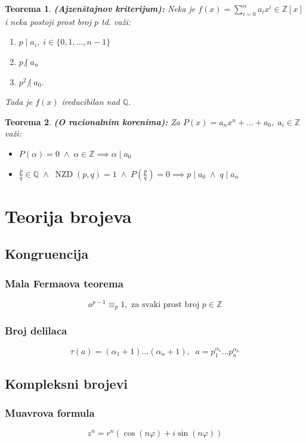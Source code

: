 \documentclass[a4paper,12pt,twoside]{report}
\newtheorem{theorem}{Teorema}[section]
\numberwithin{algorithm}{section}
\begin{document}
\begin{theorem}
    \textbf{(Ajzenštajnov kriterijum):} Neka je $f(x) = \sum_{i=0}^{n}a_ix^i \in \mathbb{Z}[x]$ i neka postoji prost broj $p$ td. važi:
    \begin{enumerate}
        \item $p\;|\; a_i, \; i \in \{0, 1, \dots, n-1\}$
        \item $p \;\not | \; a_n$
        \item $p^2 \;\not | \; a_0$.
    \end{enumerate}
    Tada je $f(x)$ ireducibilan nad $\mathbb{Q}$.
\end{theorem}

\begin{theorem}
    \textbf{(O racionalnim korenima):}
    Za $P(x) = a_nx^n + \dots + a_0, \; a_i \in \mathbb{Z}$ važi:
\begin{itemize}
    \item $P(\alpha) = 0 \;\land\; \alpha \in \mathbb{Z} \implies \alpha \;| \;a_0$
    \item $\frac{p}{q} \in \mathbb{Q} \;\land\; \operatorname{NZD}(p,q) = 1 \;\land\; P(\frac{p}{q}) = 0 \implies p \;|\; a_0 \;\land\; q \;|\; a_n$
\end{itemize}
\end{theorem}



\newpage
\chapter{Teorija brojeva}
\section{Kongruencija}
\subsection{Mala Fermaova teorema}
\[a^{p-1} \equiv_p 1, \text{ za svaki prost broj $p \in \mathbb{Z}$}\]
\subsection{Broj delilaca}
\[
    \tau(a) = (\alpha_1+1)\dots (\alpha_n + 1), \;\; a = p_1^{\alpha_1}\dots p_n^{\alpha_n}
\]
\section{Kompleksni brojevi}
\subsection{Muavrova formula}
\[ 
    z^n = r^n(\cos(n\varphi) + i\sin(n\varphi))
\]
\end{document}
